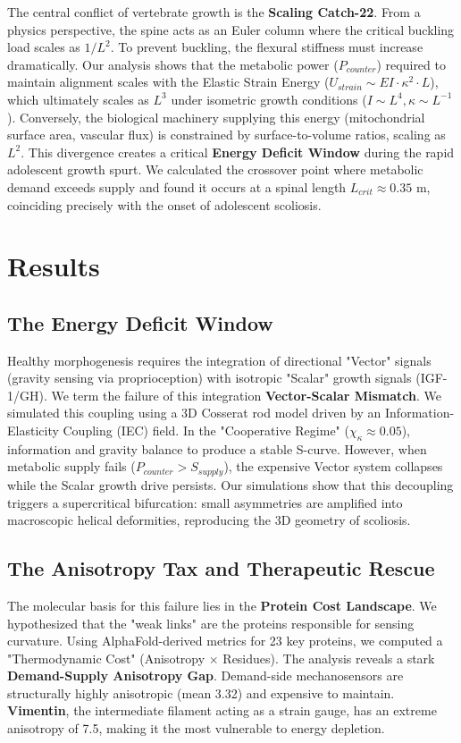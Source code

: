 \documentclass[11pt]{article}
\begin{document}
The central conflict of vertebrate growth is the \textbf{Scaling Catch-22}. From a physics perspective, the spine acts as an Euler column where the critical buckling load scales as $1/L^2$. To prevent buckling, the flexural stiffness must increase dramatically. Our analysis shows that the metabolic power ($P_{counter}$) required to maintain alignment scales with the Elastic Strain Energy ($U_{strain} \sim EI \cdot \kappa^2 \cdot L$), which ultimately scales as $L^3$ under isometric growth conditions ($I \sim L^4, \kappa \sim L^{-1}$). Conversely, the biological machinery supplying this energy (mitochondrial surface area, vascular flux) is constrained by surface-to-volume ratios, scaling as $L^2$\cite{west1997general,rolfe1997cellular}. This divergence creates a critical \textbf{Energy Deficit Window} during the rapid adolescent growth spurt. We calculated the crossover point where metabolic demand exceeds supply and found it occurs at a spinal length $L_{crit} \approx 0.35$ m, coinciding precisely with the onset of adolescent scoliosis.

\section*{Results}

\subsection*{The Energy Deficit Window}
Healthy morphogenesis requires the integration of directional "Vector" signals (gravity sensing via proprioception) with isotropic "Scalar" growth signals (IGF-1/GH). We term the failure of this integration \textbf{Vector-Scalar Mismatch}. We simulated this coupling using a 3D Cosserat rod model driven by an Information-Elasticity Coupling (IEC) field. In the "Cooperative Regime" ($\chi_\kappa \approx 0.05$), information and gravity balance to produce a stable S-curve. However, when metabolic supply fails ($P_{counter} > S_{supply}$), the expensive Vector system collapses while the Scalar growth drive persists. Our simulations show that this decoupling triggers a supercritical bifurcation: small asymmetries are amplified into macroscopic helical deformities, reproducing the 3D geometry of scoliosis.

\subsection*{The Anisotropy Tax and Therapeutic Rescue}
The molecular basis for this failure lies in the \textbf{Protein Cost Landscape}. We hypothesized that the "weak links" are the proteins responsible for sensing curvature. Using AlphaFold-derived metrics for 23 key proteins, we computed a "Thermodynamic Cost" (Anisotropy $\times$ Residues). The analysis reveals a stark \textbf{Demand-Supply Anisotropy Gap}. Demand-side mechanosensors are structurally highly anisotropic (mean 3.32) and expensive to maintain. \textbf{Vimentin}, the intermediate filament acting as a strain gauge\cite{wuest2025vim}, has an extreme anisotropy of 7.5, making it the most vulnerable to energy depletion.
\end{document}
